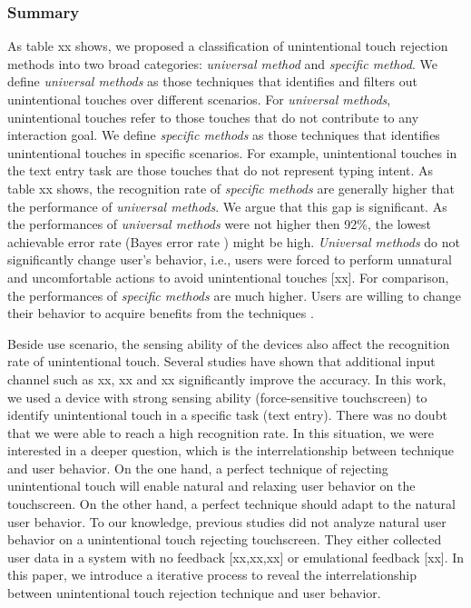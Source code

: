 \subsubsection{Summary}

As table xx shows, we proposed a classification of unintentional touch rejection methods into two broad categories: \emph{universal method} and \emph{specific method}. We define \emph{universal methods} as those techniques that identifies and filters out unintentional touches over different scenarios. For \emph{universal methods}, unintentional touches refer to those touches that do not contribute to any interaction goal. We define \emph{specific methods} as those techniques that identifies unintentional touches in specific scenarios. For example, unintentional touches in the text entry task are those touches that do not represent typing intent. As table xx shows, the recognition rate of \emph{specific methods} are generally higher that the performance of \emph{universal methods}. We argue that this gap is significant. As the performances of \emph{universal methods} were not higher then 92\%, the lowest achievable error rate (Bayes error rate \cite{tumer1996estimating}) might be high. \emph{Universal methods} do not significantly change user's behavior, i.e., users were forced to perform unnatural and uncomfortable actions to avoid unintentional touches \cite{2014-PenMightier} [xx]. For comparison, the performances of \emph{specific methods} are much higher. Users are willing to change their behavior to acquire benefits from the techniques \cite{2013-TapBoard,2016-TapBoard2}.

Beside use scenario, the sensing ability of the devices also affect the recognition rate of unintentional touch. Several studies have shown that additional input channel such as xx, xx and xx significantly improve the accuracy. In this work, we used a device with strong sensing ability (force-sensitive touchscreen) to identify unintentional touch in a specific task (text entry). There was no doubt that we were able to reach a high recognition rate. In this situation, we were interested in a deeper question, which is the interrelationship between technique and user behavior. On the one hand, a perfect technique of rejecting unintentional touch will enable natural and relaxing user behavior on the touchscreen. On the other hand, a perfect technique should adapt to the natural user behavior. To our knowledge, previous studies did not analyze natural user behavior on a unintentional touch rejecting touchscreen. They either collected user data in a system with no feedback [xx,xx,xx] or emulational feedback [xx]. In this paper, we introduce a iterative process to reveal the interrelationship between unintentional touch rejection technique and user behavior.

